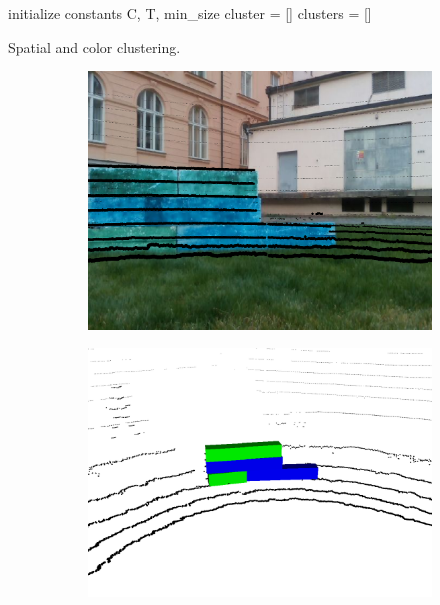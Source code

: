\begin{algorithm}[H]
	initialize constants C, T, min\_size \;
	cluster = []\;
	clusters = []\;
	\caption{Spatial and color clustering.}
	\label{alg:clustering}
\end{algorithm}

\vspace{3mm}

\begin{figure}[H]
	
	\begin{subfigure}{0.49\textwidth}
		\centering
		\includegraphics[scale=0.2]{fig/colors_camera}
	\end{subfigure}
	\begin{subfigure}{0.49\textwidth}
		\centering
		\includegraphics[scale=0.19]{fig/colors_lidar}
	\end{subfigure}
	

\end{figure}
